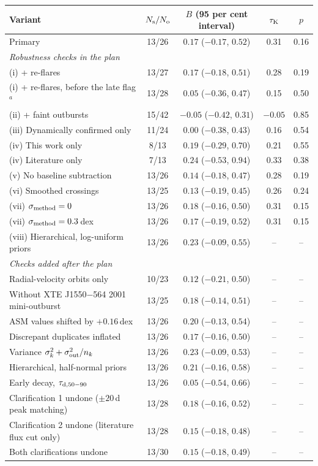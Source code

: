 \documentclass[fleqn,usenatbib]{mnras}
\newcommand{\dex}{\,dex}
\begin{document}
\begin{table}
\vspace{8pt}
\begin{tabular}{lcccc}
\toprule
Variant & $N_{\rm s}/N_{\rm o}$ & $B$ (95 per cent interval) & $\tau_{\rm K}$ & $p$ \\
\midrule
Primary & 13/26 & $0.17$ ($-0.17$, $0.52$) & 0.31 & 0.16 \\
\multicolumn{5}{l}{\textit{Robustness checks in the plan}} \\
(i) + re-flares & 13/27 & $0.17$ ($-0.18$, $0.51$) & 0.28 & 0.19 \\
(i) + re-flares, before the late flag$^{a}$ & 13/28 & $0.05$ ($-0.36$, $0.47$) & 0.15 & 0.50 \\
(ii) + faint outbursts & 15/42 & $-0.05$ ($-0.42$, $0.31$) & $-0.05$ & 0.85 \\
(iii) Dynamically confirmed only & 11/24 & $0.00$ ($-0.38$, $0.43$) & 0.16 & 0.54 \\
(iv) This work only & 8/13 & $0.19$ ($-0.29$, $0.70$) & 0.21 & 0.55 \\
(iv) Literature only & 7/13 & $0.24$ ($-0.53$, $0.94$) & 0.33 & 0.38 \\
(v) No baseline subtraction & 13/26 & $0.14$ ($-0.18$, $0.47$) & 0.28 & 0.19 \\
(vi) Smoothed crossings & 13/25 & $0.13$ ($-0.19$, $0.45$) & 0.26 & 0.24 \\
(vii) $\sigma_{\rm method}=0$ & 13/26 & $0.18$ ($-0.16$, $0.50$) & 0.31 & 0.15 \\
(vii) $\sigma_{\rm method}=0.3$\dex & 13/26 & $0.17$ ($-0.19$, $0.52$) & 0.31 & 0.15 \\
(viii) Hierarchical, log-uniform priors & 13/26 & $0.23$ ($-0.09$, $0.55$) & -- & -- \\
\multicolumn{5}{l}{\textit{Checks added after the plan}} \\
Radial-velocity orbits only & 10/23 & $0.12$ ($-0.21$, $0.50$) & -- & -- \\
Without XTE J1550$-$564 2001 mini-outburst & 13/25 & $0.18$ ($-0.14$, $0.51$) & -- & -- \\
ASM values shifted by $+0.16$\dex & 13/26 & $0.20$ ($-0.13$, $0.54$) & -- & -- \\
Discrepant duplicates inflated & 13/26 & $0.17$ ($-0.16$, $0.50$) & -- & -- \\
Variance $\sigma_k^2+\sigma_{\rm out}^2/n_k$ & 13/26 & $0.23$ ($-0.09$, $0.53$) & -- & -- \\
Hierarchical, half-normal priors & 13/26 & $0.21$ ($-0.16$, $0.58$) & -- & -- \\
Early decay, $\tau_{\rm d,50-90}$ & 13/26 & $0.05$ ($-0.54$, $0.66$) & -- & -- \\
Clarification 1 undone ($\pm20$\,d peak matching) & 13/28 & $0.18$ ($-0.16$, $0.52$) & -- & -- \\
Clarification 2 undone (literature flux cut only) & 13/28 & $0.15$ ($-0.18$, $0.48$) & -- & -- \\
Both clarifications undone & 13/30 & $0.15$ ($-0.18$, $0.49$) & -- & -- \\
\bottomrule
\end{tabular}
\end{table}
\end{document}
